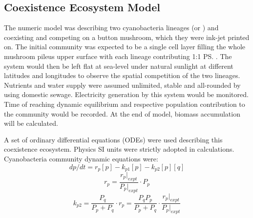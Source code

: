\documentclass[../thesis.tex]{subfiles} %
\begin{document}
\subsection{Coexistence Ecosystem Model}

The numeric model was describing two cyanobacteria lineages \Ss\autocite{sawa2017electricity} (or \As)\autocite{joshi2018bacterial} and \Cs\autocite{baque2013boss,nurnberg2018photochemistry} coexisting and competing on a button mushroom,\autocite{joshi2018bacterial} which they were ink-jet printed on.  The initial community was expected to be a single cell layer filling the whole mushroom pileus upper surface with each lineage contributing 1:1 \ps.  The system would then be left flat at sea-level under natural sunlight at different latitudes and longitudes to observe the spatial competition of the two lineages.  Nutrients and water supply were assumed unlimited, stable and all-rounded by using domestic sewage.\autocite{markou2014microalgal}  Electricity generation by this system would be monitored.  Time of reaching dynamic equilibrium and respective population contribution to the community would be recorded.  At the end of model, biomass accumulation will be calculated.

A set of ordinary differential equations (ODEs) were used describing this coexistence ecosystem.  Physics SI units were strictly adopted in calculations.  Cyanobacteria community dynamic equations were:
\begin{equation}\label{eq:main}
    dp/dt = r_p [p] - k_{p1} [p] - k_{p2} [p][q]
\end{equation}
\begin{equation}\label{eq:growth}
    r_p = \dfrac{r_p|_{expt}}{P_p|_{expt}}\cdot P_p
\end{equation}
\begin{equation}\label{eq:compete}
    k_{p2} = \dfrac{P_q}{P_p + P_q}\cdot r_p = \dfrac{P_q P_p}{P_p + P_q}\cdot \dfrac{r_p|_{expt}}{P_p|_{expt}}
\end{equation}
\end{document}

